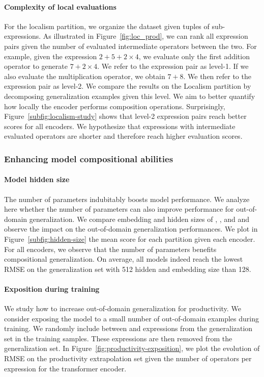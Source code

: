 \paragraph{Complexity of local evaluations} For the localism partition, we organize the dataset given tuples of sub-expressions. As illustrated in Figure~\ref{fig:loc_prod}, we can rank all expression pairs given the number of evaluated intermediate operators between the two. For example, given the expression $2 + 5 + 2 \times 4$, we evaluate only the first addition operator to generate $7 + 2 \times 4$. We refer to the expression pair as level-1. If we also evaluate the multiplication operator, we obtain $7 + 8$. We then refer to the expression pair as level-2. We compare the results on the Localism partition by decomposing generalization examples given this level. We aim to better quantify how locally the encoder performs composition operations. Surprisingly, Figure~\ref{subfig:localism-study} shows that level-2 expression pairs reach better scores for all encoders. We hypothesize that expressions with intermediate evaluated operators are shorter and therefore reach higher evaluation scores.

\subsubsection{Enhancing model compositional abilities}

\paragraph{Model hidden size} The number of parameters indubitably boosts model performance. We analyze here whether the number of parameters can also improve performance for out-of-domain generalization. We compare embedding and hidden sizes of , , and  and observe the impact on the out-of-domain generalization performances. We plot in Figure~\ref{subfig:hidden-size} the mean score for each partition given each encoder. For all encoders, we observe that the number of parameters benefits compositional generalization. On average, all models indeed reach the lowest RMSE on the generalization set with 512 hidden and embedding size than 128.

\paragraph{Exposition during training} We study how to increase out-of-domain generalization for productivity. We consider exposing the model to a small number of out-of-domain examples during training. We randomly include between  and  expressions from the generalization set in the training samples. These expressions are then removed from the generalization set. In Figure~\ref{fig:productivity-exposition}, we plot the evolution of RMSE on the productivity extrapolation set given the number of operators per expression for the transformer encoder. 

